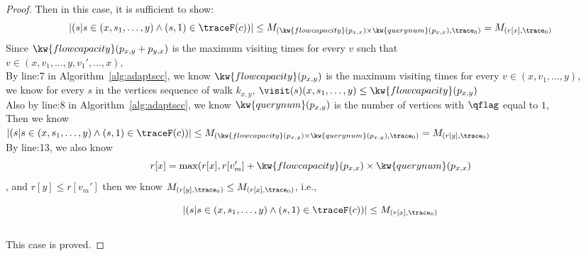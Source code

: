 \begin{proof}
  Then in this case, it is sufficient to show: 
  $$ 
  |(s | s \in (x, s_1, \ldots, y) \land (s, 1)\in \traceF(c))| \leq M_{(\kw{flowcapacity}(p_{x, x}) \times \kw{querynum}(p_{x, x}) , \trace_0)} = M_{(r[x], \trace_0)}
  $$
Since $\kw{flowcapacity}(p_{x, y} + p_{y, x})$ is the maximum visiting times for every $v$ such that
\\
 $v \in (x, v_1, \ldots, y, v_1', \ldots, x)$, 
\\
By line:7 in Algorithm~\ref{alg:adaptscc}, we know $\kw{flowcapacity}(p_{x, y})$ is the maximum visiting times for every $v \in (x, v_1, \ldots, y)$, 
\\
we know for every $s$ in the vertices sequence of walk $k_{x,y}$, 
$\visit(s) (x, s_1, \ldots, y)  \leq \kw{flowcapacity}(p_{x, y})$
  \\
  Also by line:8 in Algorithm~\ref{alg:adaptscc}, we know $\kw{querynum}(p_{x, y})$ is the number of vertices with $\qflag$ equal to $1$,
  \\
  Then we know 
  \\
  $|(s | s \in (x, s_1, \ldots, y) \land (s, 1)\in \traceF(c))| \leq M_{(\kw{flowcapacity}(p_{x, y}) \times \kw{querynum}(p_{x, y}), \trace_0)} = M_{(r[y], \trace_0)}$
  \\
  By line:13, we also know 
  $$r[x] = \max(r[x], r[v_{m}'] + \kw{flowcapacity}(p_{x, x}) \times \kw{querynum}(p_{x, x})$$, and $r[y] \leq r[v_{m}']$
  then we know 
  $M_{(r[y], \trace_0)} \leq M_{(r[x], \trace_0)}$, i.e., 

  $$|(s | s \in (x, s_1, \ldots, y) \land (s, 1)\in \traceF(c))| \leq M_{(r[x], \trace_0)}$$
  \\
  This case is proved.
%
%
\end{proof}